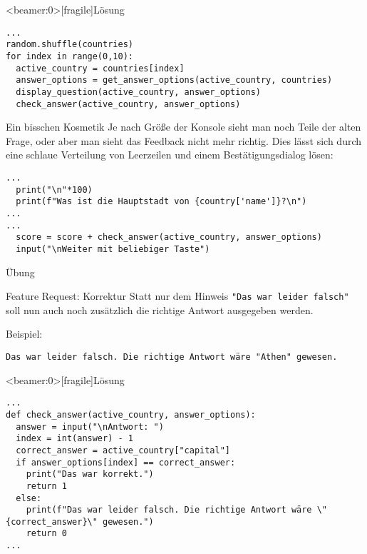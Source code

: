 \begin{frame}<beamer:0>[fragile]{Lösung}
	
\begin{solutionblock}{}
\begin{verbatim}
...
random.shuffle(countries)
for index in range(0,10):
  active_country = countries[index]
  answer_options = get_answer_options(active_country, countries)
  display_question(active_country, answer_options)
  check_answer(active_country, answer_options)
\end{verbatim}
\end{solutionblock}
\end{frame}


\begin{fragile}
\begin{block}{Ein bisschen Kosmetik}
\vspace{2pt}
Je nach Größe der Konsole sieht man noch Teile der alten Frage, oder aber man sieht das Feedback nicht mehr richtig. 
Dies lässt sich durch eine schlaue Verteilung von Leerzeilen und einem Bestätigungsdialog lösen: 

\begin{verbatim}
...
  print("\n"*100)
  print(f"Was ist die Hauptstadt von {country['name']}?\n")
...
...
  score = score + check_answer(active_country, answer_options)
  input("\nWeiter mit beliebiger Taste")
\end{verbatim}

\end{block}
\end{fragile}


\begin{frame}{Übung}
\begin{block}{Feature Request: Korrektur}
\vspace{2pt}
Statt nur dem Hinweis \texttt{"Das war leider falsch"} soll nun auch noch zusätzlich die richtige Antwort ausgegeben werden. 
\vspace{2pt}

Beispiel: 

\texttt{Das war leider falsch. Die richtige Antwort wäre "{}Athen"{} gewesen.} 
\end{block}
\end{frame}


\begin{frame}<beamer:0>[fragile]{Lösung}

\begin{solutionblock}{}
\begin{verbatim}
...
def check_answer(active_country, answer_options):
  answer = input("\nAntwort: ")
  index = int(answer) - 1
  correct_answer = active_country["capital"]
  if answer_options[index] == correct_answer:
    print("Das war korrekt.")
    return 1
  else:
    print(f"Das war leider falsch. Die richtige Antwort wäre \"{correct_answer}\" gewesen.")
    return 0
...
\end{verbatim}
\end{solutionblock}
\end{frame}

